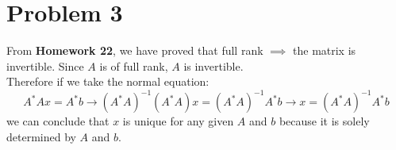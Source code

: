 \documentclass[fleqn]{article}
\begin{document}
\section*{Problem 3}
From \textbf{Homework 22}, we have proved that full rank $\implies$ the matrix is\\ invertible.  Since $A$ is of full rank, $A$ is invertible.\\
Therefore if we take the normal equation:\\
\begin{equation*}
    A^{*}Ax =A^{*}b \rightarrow (A^{*}A)^{-1}(A^{*}A)x = (A^{*}A)^{-1}A^{*}b \rightarrow x = (A^{*}A)^{-1}A^{*}b
\end{equation*}
we can conclude that $x$ is unique for any given $A$ and $b$ because it is solely determined by $A$ and $b$.
\end{document}
